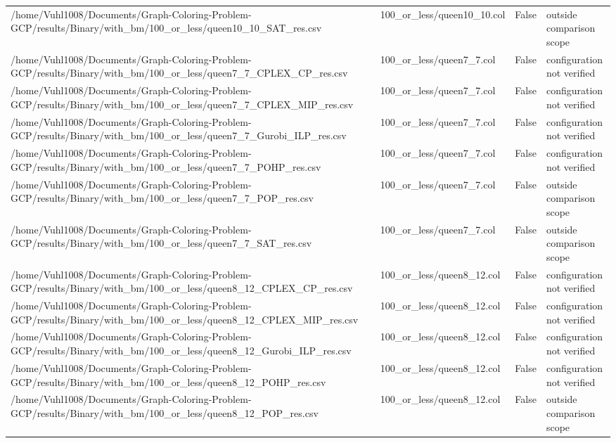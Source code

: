 \begin{table}[htbp]
\begin{tabular}{llll}
/home/Vuhl1008/Documents/Graph-Coloring-Problem-GCP/results/Binary/with\_bm/100\_or\_less/queen10\_10\_SAT\_res.csv & 100\_or\_less/queen10\_10.col & False & outside comparison scope \\
/home/Vuhl1008/Documents/Graph-Coloring-Problem-GCP/results/Binary/with\_bm/100\_or\_less/queen7\_7\_CPLEX\_CP\_res.csv & 100\_or\_less/queen7\_7.col & False & configuration not verified \\
/home/Vuhl1008/Documents/Graph-Coloring-Problem-GCP/results/Binary/with\_bm/100\_or\_less/queen7\_7\_CPLEX\_MIP\_res.csv & 100\_or\_less/queen7\_7.col & False & configuration not verified \\
/home/Vuhl1008/Documents/Graph-Coloring-Problem-GCP/results/Binary/with\_bm/100\_or\_less/queen7\_7\_Gurobi\_ILP\_res.csv & 100\_or\_less/queen7\_7.col & False & configuration not verified \\
/home/Vuhl1008/Documents/Graph-Coloring-Problem-GCP/results/Binary/with\_bm/100\_or\_less/queen7\_7\_POHP\_res.csv & 100\_or\_less/queen7\_7.col & False & configuration not verified \\
/home/Vuhl1008/Documents/Graph-Coloring-Problem-GCP/results/Binary/with\_bm/100\_or\_less/queen7\_7\_POP\_res.csv & 100\_or\_less/queen7\_7.col & False & outside comparison scope \\
/home/Vuhl1008/Documents/Graph-Coloring-Problem-GCP/results/Binary/with\_bm/100\_or\_less/queen7\_7\_SAT\_res.csv & 100\_or\_less/queen7\_7.col & False & outside comparison scope \\
/home/Vuhl1008/Documents/Graph-Coloring-Problem-GCP/results/Binary/with\_bm/100\_or\_less/queen8\_12\_CPLEX\_CP\_res.csv & 100\_or\_less/queen8\_12.col & False & configuration not verified \\
/home/Vuhl1008/Documents/Graph-Coloring-Problem-GCP/results/Binary/with\_bm/100\_or\_less/queen8\_12\_CPLEX\_MIP\_res.csv & 100\_or\_less/queen8\_12.col & False & configuration not verified \\
/home/Vuhl1008/Documents/Graph-Coloring-Problem-GCP/results/Binary/with\_bm/100\_or\_less/queen8\_12\_Gurobi\_ILP\_res.csv & 100\_or\_less/queen8\_12.col & False & configuration not verified \\
/home/Vuhl1008/Documents/Graph-Coloring-Problem-GCP/results/Binary/with\_bm/100\_or\_less/queen8\_12\_POHP\_res.csv & 100\_or\_less/queen8\_12.col & False & configuration not verified \\
/home/Vuhl1008/Documents/Graph-Coloring-Problem-GCP/results/Binary/with\_bm/100\_or\_less/queen8\_12\_POP\_res.csv & 100\_or\_less/queen8\_12.col & False & outside comparison scope \\

\end{tabular}
\end{table}
